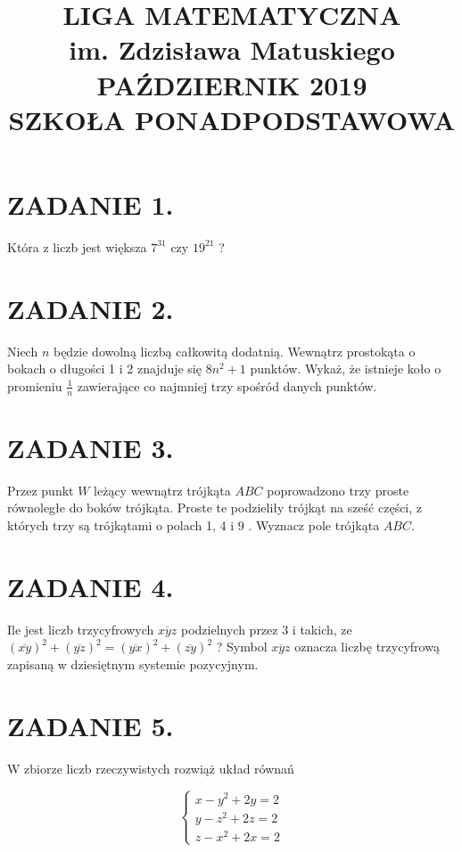 \documentclass[10pt]{article}
\title{LIGA MATEMATYCZNA \\
 im. Zdzisława Matuskiego \\
 PAŹDZIERNIK 2019 \\
 SZKOŁA PONADPODSTAWOWA }
\author{}
\date{}
\begin{document}
\maketitle
\section*{ZADANIE 1.}
Która z liczb jest większa \(7^{31}\) czy \(19^{21}\) ?

\section*{ZADANIE 2.}
Niech \(n\) będzie dowolną liczbą całkowitą dodatnią. Wewnątrz prostokąta o bokach o długości 1 i 2 znajduje się \(8 n^{2}+1\) punktów. Wykaż, że istnieje koło o promieniu \(\frac{1}{n}\) zawierające co najmniej trzy spośród danych punktów.

\section*{ZADANIE 3.}
Przez punkt \(W\) leżący wewnątrz trójkąta \(A B C\) poprowadzono trzy proste równoległe do boków trójkąta. Proste te podzieliły trójkąt na sześć części, z których trzy są trójkątami o polach 1, 4 i 9 . Wyznacz pole trójkąta \(A B C\).

\section*{ZADANIE 4.}
Ile jest liczb trzycyfrowych \(\overline{x y z}\) podzielnych przez 3 i takich, ze \((\overline{x y})^{2}+(\overline{y z})^{2}=(\overline{y x})^{2}+(\overline{z y})^{2}\) ? Symbol \(\overline{x y z}\) oznacza liczbę trzycyfrową zapisaną w dziesiętnym systemie pozycyjnym.

\section*{ZADANIE 5.}
W zbiorze liczb rzeczywistych rozwiąż układ równań

\[
\left\{\begin{array}{l}
x-y^{2}+2 y=2 \\
y-z^{2}+2 z=2 \\
z-x^{2}+2 x=2
\end{array}\right.
\]
\end{document}
